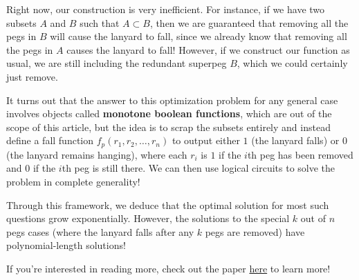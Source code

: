 \documentclass{article}
\begin{document}
Right now, our construction is very inefficient. For instance, if we have two subsets $A$ and $B$ such that $A\subset B$, then we are guaranteed that removing all the pegs in $B$ will cause the lanyard to fall, since we already know that removing all the pegs in $A$ causes the lanyard to fall! However, if we construct our function as usual, we are still including the redundant superpeg $B$, which we could certainly just remove. 

It turns out that the answer to this optimization problem for any general case involves objects called \textbf{monotone boolean functions}, which are out of the scope of this article, but the idea is to scrap the subsets entirely and instead define a fall function $f_p(r_1,r_2,\dots,r_n)$ to output either $1$ (the lanyard falls) or $0$ (the lanyard remains hanging), where each $r_i$ is $1$ if the $i$th peg has been removed and $0$ if the $i$th peg is still there. We can then use logical circuits to solve the problem in complete generality! 

Through this framework, we deduce that the optimal solution for most such questions grow exponentially. However, the solutions to the special $k$ out of $n$ pegs cases (where the lanyard falls after any $k$ pegs are removed) have polynomial-length solutions!

If you’re interested in reading more, check out the paper \href{https://erikdemaine.org/papers/PictureHanging_FUN2012/paper.pdf}{here} to learn more!
\end{document}
